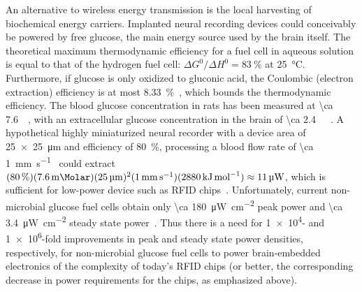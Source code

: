 An alternative to wireless energy transmission is the local harvesting of biochemical energy carriers. Implanted neural recording devices could conceivably be powered by free glucose, the main energy source used by the brain itself.
The theoretical maximum thermodynamic efficiency for a fuel cell in aqueous solution is equal to that of the hydrogen fuel cell: $\Delta G^0/\Delta H^0 = \SI{83}{\percent}$ at \SI{25}{\degreeCelsius}.
Furthermore, if glucose is only oxidized to gluconic acid, the Coulombic (electron extraction) efficiency is at most \SI{8.33}{\percent}~\cite{rapoport12}, which bounds the thermodynamic efficiency.
The blood glucose concentration in rats has been measured at \SI{\ca 7.6}{\milli\Molar}, with an extracellular glucose concentration in the brain of \SI{\ca 2.4}{\milli\Molar}~\cite{silver94}.
A hypothetical highly miniaturized neural recorder with a device area of \SI{25 x 25}{\micro\meter} and efficiency of \SI{80}{\percent}, processing a blood flow rate of \SI{\ca 1}{\milli\meter\per\second}~\cite{ivanov81} could extract $(\SI{80}{\percent})(\SI{7.6}{\milli\Molar})(\SI{25}{\micro\meter})^2(\SI{1}{\milli\meter\per\second})(\SI{2880}{\kilo\joule\per\mole})\approx \SI{11}{\micro\watt}$, which is sufficient for low-power device such as RFID chips~\cite{cho05}.
Unfortunately, current non-microbial glucose fuel cells obtain only \SI{\ca 180}{\micro\watt\per\centi\meter\squared} peak power and \SI{\ca 3.4}{\micro\watt\per\centi\meter\squared} steady state power~\cite{rapoport12}.
Thus there is a need for \num{1e4}- and \num{1e6}-fold improvements in peak and steady state power densities, respectively, for non-microbial glucose fuel cells to power brain-embedded electronics of the complexity of today's RFID chips (or better, the corresponding decrease in power requirements for the chips, as emphasized above).

